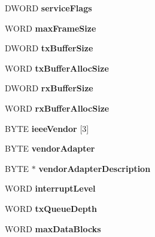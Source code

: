 \begin{DoxyCompactItemize}
\item 
\hypertarget{struct___mac_chars_a17685475efebceba8e714b4765f16231}{
DWORD {\bfseries serviceFlags}}
\label{struct___mac_chars_a17685475efebceba8e714b4765f16231}

\item 
\hypertarget{struct___mac_chars_aedec512d21e494b81627ac0e10b30da8}{
WORD {\bfseries maxFrameSize}}
\label{struct___mac_chars_aedec512d21e494b81627ac0e10b30da8}

\item 
\hypertarget{struct___mac_chars_a5941faf06ca004cc6b37e388714c2678}{
DWORD {\bfseries txBufferSize}}
\label{struct___mac_chars_a5941faf06ca004cc6b37e388714c2678}

\item 
\hypertarget{struct___mac_chars_a4cad34214e4e937a7321e5b7d0b44c22}{
WORD {\bfseries txBufferAllocSize}}
\label{struct___mac_chars_a4cad34214e4e937a7321e5b7d0b44c22}

\item 
\hypertarget{struct___mac_chars_ade141a04ceba6c5b845edf00e47e2a63}{
DWORD {\bfseries rxBufferSize}}
\label{struct___mac_chars_ade141a04ceba6c5b845edf00e47e2a63}

\item 
\hypertarget{struct___mac_chars_a1a013b570523e0583eb954ca480fb210}{
WORD {\bfseries rxBufferAllocSize}}
\label{struct___mac_chars_a1a013b570523e0583eb954ca480fb210}

\item 
\hypertarget{struct___mac_chars_ae5a5109d78daea3677e843f6966da755}{
BYTE {\bfseries ieeeVendor} \mbox{[}3\mbox{]}}
\label{struct___mac_chars_ae5a5109d78daea3677e843f6966da755}

\item 
\hypertarget{struct___mac_chars_a0bd74d1ef1ee3b63698b6e796f173c85}{
BYTE {\bfseries vendorAdapter}}
\label{struct___mac_chars_a0bd74d1ef1ee3b63698b6e796f173c85}

\item 
\hypertarget{struct___mac_chars_a9843bf19ac27707c2ca1397853a608ca}{
BYTE $\ast$ {\bfseries vendorAdapterDescription}}
\label{struct___mac_chars_a9843bf19ac27707c2ca1397853a608ca}

\item 
\hypertarget{struct___mac_chars_ac984f083db4c507414c61a3d7498bede}{
WORD {\bfseries interruptLevel}}
\label{struct___mac_chars_ac984f083db4c507414c61a3d7498bede}

\item 
\hypertarget{struct___mac_chars_af4e958a5beccb15367aadc61e6b74146}{
WORD {\bfseries txQueueDepth}}
\label{struct___mac_chars_af4e958a5beccb15367aadc61e6b74146}

\item 
\hypertarget{struct___mac_chars_a26b6241ea6bfc2c1c027b66f936bceea}{
WORD {\bfseries maxDataBlocks}}
\label{struct___mac_chars_a26b6241ea6bfc2c1c027b66f936bceea}

\end{DoxyCompactItemize}


